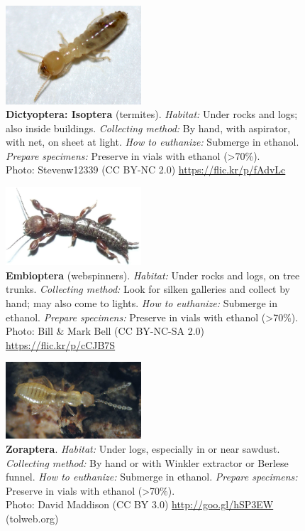 \documentclass[letterpaper, 11pt]{article}
\begin{document}
\clearpage

\begin{figure}
  \caption{\textbf{Dictyoptera: Isoptera} (termites). \textit{Habitat:} Under rocks and logs; also inside buildings. \textit{Collecting method:} By hand, with aspirator, with net, on sheet at light. \textit{How to euthanize:} Submerge in ethanol. \textit{Prepare specimens:} Preserve in vials with ethanol (\textgreater70\%). \\ Photo: Stevenw12339 (CC BY-NC 2.0) \url{https://flic.kr/p/fAdvLc}}
  \includegraphics[width=0.45\textwidth]{BlattodeaIsoptera}
\end{figure}

\begin{figure}
  \caption{\textbf{Embioptera} (webspinners). \textit{Habitat:} Under rocks and logs, on tree trunks. \textit{Collecting method:} Look for silken galleries and collect by hand; may also come to lights. \textit{How to euthanize:} Submerge in ethanol. \textit{Prepare specimens:} Preserve in vials with ethanol (\textgreater70\%).\\ Photo: Bill \& Mark Bell (CC BY-NC-SA 2.0) \url{https://flic.kr/p/cCJB7S}}
  \includegraphics[width=0.45\textwidth]{Embioptera}
\end{figure}

\begin{figure}
  \caption{\textbf{Zoraptera}. \textit{Habitat:} Under logs, especially in or near sawdust. \textit{Collecting method:} By hand or with Winkler extractor or Berlese funnel. \textit{How to euthanize:} Submerge in ethanol. \textit{Prepare specimens:} Preserve in vials with ethanol (\textgreater70\%).\\ Photo: David Maddison (CC BY 3.0) \url{http://goo.gl/hSP3EW} (tolweb.org)}
  \includegraphics[width=0.45\textwidth]{Zoraptera}
\end{figure}
\end{document}
